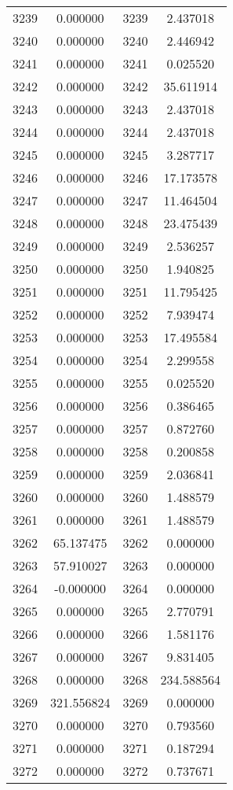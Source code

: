 \documentclass[12pt]{article}
\begin{document}
\begin{longtable}{@{}cccc@{}}
3239 & 0.000000 & 3239 & 2.437018 \\
3240 & 0.000000 & 3240 & 2.446942 \\
3241 & 0.000000 & 3241 & 0.025520 \\
3242 & 0.000000 & 3242 & 35.611914 \\
3243 & 0.000000 & 3243 & 2.437018 \\
3244 & 0.000000 & 3244 & 2.437018 \\
3245 & 0.000000 & 3245 & 3.287717 \\
3246 & 0.000000 & 3246 & 17.173578 \\
3247 & 0.000000 & 3247 & 11.464504 \\
3248 & 0.000000 & 3248 & 23.475439 \\
3249 & 0.000000 & 3249 & 2.536257 \\
3250 & 0.000000 & 3250 & 1.940825 \\
3251 & 0.000000 & 3251 & 11.795425 \\
3252 & 0.000000 & 3252 & 7.939474 \\
3253 & 0.000000 & 3253 & 17.495584 \\
3254 & 0.000000 & 3254 & 2.299558 \\
3255 & 0.000000 & 3255 & 0.025520 \\
3256 & 0.000000 & 3256 & 0.386465 \\
3257 & 0.000000 & 3257 & 0.872760 \\
3258 & 0.000000 & 3258 & 0.200858 \\
3259 & 0.000000 & 3259 & 2.036841 \\
3260 & 0.000000 & 3260 & 1.488579 \\
3261 & 0.000000 & 3261 & 1.488579 \\
3262 & 65.137475 & 3262 & 0.000000 \\
3263 & 57.910027 & 3263 & 0.000000 \\
3264 & -0.000000 & 3264 & 0.000000 \\
3265 & 0.000000 & 3265 & 2.770791 \\
3266 & 0.000000 & 3266 & 1.581176 \\
3267 & 0.000000 & 3267 & 9.831405 \\
3268 & 0.000000 & 3268 & 234.588564 \\
3269 & 321.556824 & 3269 & 0.000000 \\
3270 & 0.000000 & 3270 & 0.793560 \\
3271 & 0.000000 & 3271 & 0.187294 \\
3272 & 0.000000 & 3272 & 0.737671 \\

\end{longtable}
\end{document}
